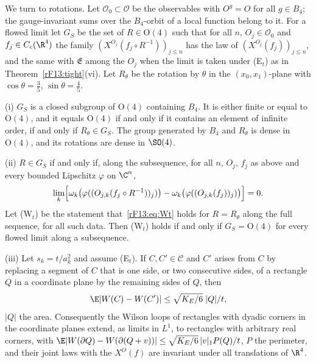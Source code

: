 We turn to rotations. Let $\mathcal O_0\subset\mathcal O$ be the observables
with $O^g=O$ for all $g\in B_4$; the gauge-invariant sums over the
$B_4$-orbit of a local function belong to it. For a flowed limit let
$G_S$ be the set of $R\in\mathrm O(4)$ such that for all $n$, $O_j\in
\mathcal O_0$ and $f_j\in C_c(\R^4)$ the family $(X^{O_j}(f_j\circ
R^{-1}))_{j\le n}$ has the law of $(X^{O_j}(f_j))_{j\le n}$, and the same with
$\mathfrak E$ among the $O_j$ when the limit is taken under (E$_t$) as in
Theorem~\ref{rF13:tight}(vi). Let $R_\theta$ be the rotation by $\theta$ in
the $(x_0,x_1)$-plane with $\cos\theta=\frac35$, $\sin\theta=\frac45$.

\begin{theorem}\label{rF13:o4}
\textup{(i)} $G_S$ is a closed subgroup of $\mathrm O(4)$ containing $B_4$.
It is either finite or equal to $\mathrm O(4)$, and it equals
$\mathrm O(4)$ if and only if it contains an element of infinite order, if
and only if $R_\theta\in G_S$. The group generated by $B_4$ and $R_\theta$
is dense in $\mathrm O(4)$, and its rotations are dense in $\SO(4)$.

\textup{(ii)} $R\in G_S$ if and only if, along the subsequence, for all
$n$, $O_j$, $f_j$ as above and every bounded Lipschitz $\varphi$ on $\C^n$,
\begin{equation}\label{rF13:eq:Wt}
\lim_k\Bigl[\omega_k\bigl(\varphi((O_{j,k}(f_j\circ R^{-1}))_j)\bigr)
-\omega_k\bigl(\varphi((O_{j,k}(f_j))_j)\bigr)\Bigr]=0 .
\end{equation}
Let \textup{(W$_t$)} be the statement that~\eqref{rF13:eq:Wt} holds for
$R=R_\theta$ along the full sequence, for all such data. Then
\textup{(W$_t$)} holds if and only if $G_S=\mathrm O(4)$ for every flowed
limit along a subsequence.

\textup{(iii)} Let $s_k=t/a_k^2$ and assume \textup{(E$_t$)}. If $C,C'\in
\mathcal C$ and $C'$ arises from $C$ by replacing a segment of $C$ that is
one side, or two consecutive sides, of a rectangle $Q$ in a coordinate
plane by the remaining sides of $Q$, then
\[
\E|W(C)-W(C')|\le\sqrt{K_E/6}\;|Q|/t ,
\]
$|Q|$ the area. Consequently the Wilson loops of rectangles with dyadic
corners in the coordinate planes extend, as limits in $L^1$, to rectangles
with arbitrary real corners, with $\E|W(\partial Q)-W(\partial(Q+v))|\le
\sqrt{K_E/6}\,|v|_1P(Q)/t$, $P$ the perimeter, and their joint laws with the
$X^O(f)$ are invariant under all translations of $\R^4$.
\end{theorem}

